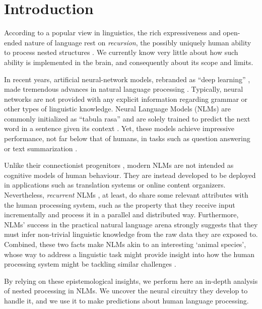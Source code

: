 \section{Introduction}

According to a popular view in linguistics, the rich expressiveness and open-ended nature of language rest on \emph{recursion}, the possibly uniquely human ability to process nested structures \citep{Chomsky:1957, Hauser:etal:2002, Dehaene:etal:2015}. 
We currently know very little about how such ability is implemented in the brain, and consequently about its scope and limits.

In recent years, artificial neural-network models, rebranded as ``deep learning'' \citep{LeCun:etal:2015}, made tremendous advances in natural language processing \citep{Goldberg:2017}. Typically, neural networks are not provided with any explicit information regarding grammar or other types of linguistic knowledge. Neural Language Models (NLMs) are commonly initialized as ``tabula rasa'' and are solely trained to predict the next word in a sentence given its context \citep{Mikolov:2012}. Yet, these models achieve impressive performance, not far below that of humans, in tasks such as question answering or text summarization \citep{Radford:etal:2019}. 

Unlike their connectionist progenitors \citep{Rumelhart:etal:1986,Rumelhart:etal:1986b}, modern NLMs are not intended as cognitive models of human behaviour. 
They are instead developed to be deployed in applications such as translation systems or online content organizers. 
Nevertheless, \emph{recurrent} NLMs  \citep{Elman:1990,Hochreiter:Schmidhuber:1997}, at least, do share some relevant attributes with the human processing system, such as the property that they receive input incrementally  and process it in a parallel and distributed way. Furthermore, NLMs' success in the practical natural language arena strongly suggests that they must infer non-trivial linguistic knowledge from the raw data they are exposed to. Combined, these two facts make NLMs akin to an interesting `animal species', whose way to address a linguistic task might provide insight into how the human processing system might be tackling similar challenges \citep[see also][]{McCloskey:1991}.

By relying on these epistemological insights, we perform here an in-depth analysis of nested processing in NLMs. 
We uncover the neural circuitry they develop to handle it, and we use it to make predictions about human language processing. 


